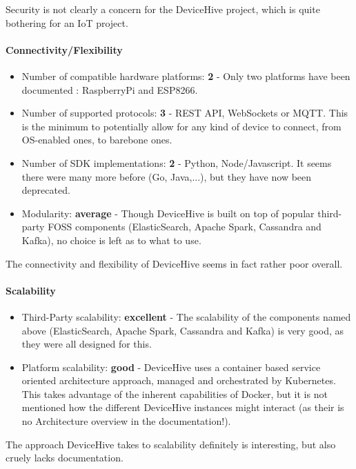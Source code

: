 \documentclass{article}
\begin{document}
Security is not clearly a concern for the DeviceHive project, which is quite bothering for an IoT project.

\paragraph{Connectivity/Flexibility}

\begin{itemize}
\item Number of compatible hardware platforms: \textbf{2} - Only two platforms have been documented : RaspberryPi and ESP8266.
\item Number of supported protocols: \textbf{3} - REST API, WebSockets or MQTT. This is the minimum to potentially allow for any kind of device to connect, from OS-enabled ones, to barebone ones.
\item Number of SDK implementations: \textbf{2} - Python, Node/Javascript. It seems there were many more before (Go, Java,...), but they have now been deprecated.
\item Modularity: \textbf{average} - Though DeviceHive is built on top of popular third-party FOSS components (ElasticSearch, Apache Spark, Cassandra and Kafka), no choice is left as to what to use.
\end{itemize}

The connectivity and flexibility of DeviceHive seems in fact rather poor overall.

\paragraph{Scalability}

\begin{itemize}
\item Third-Party scalability: \textbf{excellent} - The scalability of the components named above (ElasticSearch, Apache Spark, Cassandra and Kafka) is very good, as they were all designed for this.
\item Platform scalability: \textbf{good} - DeviceHive uses a container based service oriented architecture approach, managed and orchestrated by Kubernetes. This takes advantage of the inherent capabilities of Docker, but it is not mentioned how the different DeviceHive instances might interact (as their is no Architecture overview in the documentation!).
\end{itemize}

The approach DeviceHive takes to scalability definitely is interesting, but also cruely lacks documentation.
\end{document}
